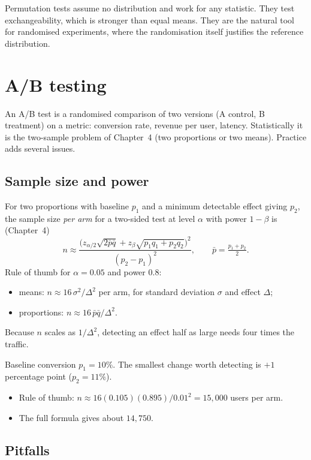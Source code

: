 Permutation tests assume no distribution and work for any statistic. They test exchangeability, which is stronger than equal means. They are the natural tool for randomised experiments, where the randomisation itself justifies the reference distribution.

\section{A/B testing}

An A/B test is a randomised comparison of two versions (A control, B treatment) on a metric: conversion rate, revenue per user, latency. Statistically it is the two-sample problem of Chapter~4 (two proportions or two means). Practice adds several issues.

\subsection{Sample size and power}

For two proportions with baseline $p_1$ and a minimum detectable effect giving $p_2$, the sample size \emph{per arm} for a two-sided test at level $\alpha$ with power $1-\beta$ is (Chapter~4)
\[ n\approx\frac{\Big(z_{\alpha/2}\sqrt{2\bar{p}\bar{q}}+z_\beta\sqrt{p_1q_1+p_2q_2}\Big)^2}{(p_2-p_1)^2},\qquad\bar{p}=\tfrac{p_1+p_2}2. \]
Rule of thumb for $\alpha=0.05$ and power $0.8$:
\begin{itemize}
  \item means: $n\approx16\,\sigma^2/\Delta^2$ per arm, for standard deviation $\sigma$ and effect $\Delta$;
  \item proportions: $n\approx16\,\bar{p}\bar{q}/\Delta^2$.
\end{itemize}
Because $n$ scales as $1/\Delta^2$, detecting an effect half as large needs four times the traffic.

\begin{example}
Baseline conversion $p_1=10\%$. The smallest change worth detecting is $+1$ percentage point ($p_2=11\%$).
\begin{itemize}
  \item Rule of thumb: $n\approx16(0.105)(0.895)/0.01^2=15{,}000$ users per arm.
  \item The full formula gives about $14{,}750$.
\end{itemize}
\end{example}

\subsection{Pitfalls}

